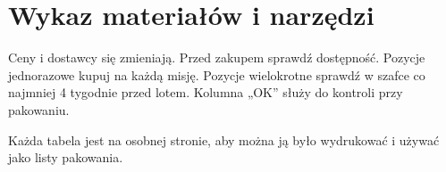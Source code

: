 \chapter{Wykaz materiałów i narzędzi}\label{ch:materialy}

Ceny i dostawcy się zmieniają. Przed zakupem sprawdź dostępność. Pozycje jednorazowe kupuj na każdą misję. Pozycje wielokrotne sprawdź w szafce co najmniej 4 tygodnie przed lotem. Kolumna „OK” służy do kontroli przy pakowaniu.

Każda tabela jest na osobnej stronie, aby można ją było wydrukować i używać jako listy pakowania.

\newcommand{\naglowekBOM}{\textbf{OK} & \textbf{Pozycja} & \textbf{Ilość} & \textbf{Typ} & \textbf{Źródło / przykład} & \textbf{Uwagi}\\\midrule}


